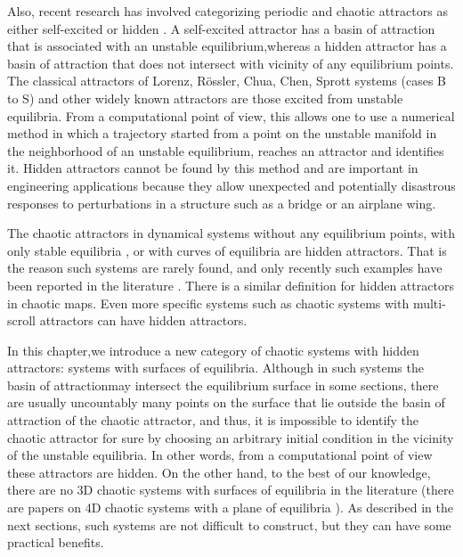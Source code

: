 Also, recent research has involved categorizing periodic
and chaotic attractors as either self-excited or hidden
\cite{02_Leonov2011Localization,03_Leonov2012Hidden,04_Dudkowski2016Hidden,05_Leonov2014Hidden}.
A self-excited attractor has a basin of attraction
that is associated with an unstable equilibrium,whereas
a hidden attractor has a basin of attraction that does
not intersect with vicinity of any equilibrium
points. The classical attractors of Lorenz, R\"{o}ssler,
Chua, Chen, Sprott systems (cases B to S) and other
widely known attractors are those excited from unstable
equilibria. From a computational point of view,
this allows one to use a numerical method in which
a trajectory started from a point on the unstable manifold
in the neighborhood of an unstable equilibrium,
reaches an attractor and identifies it\cite{02_Leonov2011Localization}. 
Hidden attractors cannot be found by this method and are important
in engineering applications because they allow unexpected
and potentially disastrous responses to perturbations
in a structure such as a bridge or an airplane
wing\cite{06_Leonov2015Hidden,07_Leonov2015Homoclinic,08_Sharma2015Control,09_Pooja2015Controlling,10_Dudkowski2016Hidden}.

The chaotic attractors in dynamical systems without
any equilibrium points\cite{11_Jafari2013Elementary,12_Sajad2014A,13_VietThanh2014Constructing,14_Fadhil2015A,15_Jafari2016Multiscroll,16_Pham2016A,17_Pham2016A,18_Wei2011Dynamical,19_Wang2012Constructing}, 
with only stable equilibria \cite{20_MALIHE2013SIMPLE,21_Kingni2014Three,22_Seng2014Cost,23_Pham2014Generating},
or with curves of equilibria\cite{24_Jafari2015Erratum,25_Kingni2016Three,26_Pham2016A,27_Pham2016A,28_Gotthans2015New}
are hidden attractors. That is the reason such
systems are rarely found, and only recently such examples
have been reported in the literature \cite{29_VietThanh2014Is,30_Pham2014Hidden,31_Jafari2015Recent,32_Pham2015Hidden,33_Shahzad2015Synchronization,34_Sprott2015A,35_Pham2016A,36_Pham2016A,37_Pham2016A}.
There is a similar definition for hidden attractors in chaotic
maps\cite{38_Jafari2016The,39_Jiang2016Hidden}. Even more specific systems such as
chaotic systems with multi-scroll attractors \cite{40_Li2016The,41_Ma2014Selection} can
have hidden attractors\cite{15_Jafari2016Multiscroll}.

In this chapter,we introduce a new category of chaotic
systems with hidden attractors: systems with surfaces
of equilibria. Although in such systems the basin of
attractionmay intersect the equilibrium surface in some
sections, there are usually uncountably many points on
the surface that lie outside the basin of attraction of the
chaotic attractor, and thus, it is impossible to identify
the chaotic attractor for sure by choosing an arbitrary
initial condition in the vicinity of the unstable equilibria.
In other words, from a computational point of view
these attractors are hidden. On the other hand, to the
best of our knowledge, there are no 3D chaotic systems
with surfaces of equilibria in the literature (there are
papers on 4D chaotic systems with a plane of equilibria
\cite{42_Jafari2016A}). As described in the next sections, such systems
are not difficult to construct, but they can have some
practical benefits.

